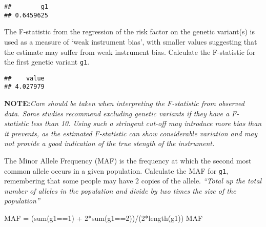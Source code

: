 \documentclass[
]{article}
\newenvironment{Shaded}{\begin{snugshade}}{\end{snugshade}}
\newcommand{\DecValTok}[1]{\textcolor[rgb]{0.00,0.00,0.81}{#1}}
\newcommand{\FunctionTok}[1]{\textcolor[rgb]{0.00,0.00,0.00}{#1}}
\newcommand{\NormalTok}[1]{#1}
\newcommand{\OtherTok}[1]{\textcolor[rgb]{0.56,0.35,0.01}{#1}}
\newcommand{\SpecialCharTok}[1]{\textcolor[rgb]{0.00,0.00,0.00}{#1}}
\begin{document}
\begin{verbatim}
##        g1 
## 0.6459625
\end{verbatim}

The F-statistic from the regression of the risk factor on the genetic
variant(s) is used as a measure of `weak instrument bias', with smaller
values suggesting that the estimate may suffer from weak instrument
bias. Calculate the F-statistic for the first genetic variant
\texttt{g1}.

\begin{Shaded}
\end{Shaded}

\begin{verbatim}
##    value 
## 4.027979
\end{verbatim}

\textbf{NOTE:}\emph{Care should be taken when interpreting the
F-statistic from observed data. Some studies recommend excluding genetic
variants if they have a F-statistic less than 10. Using such a stringent
cut-off may introduce more bias than it prevents, as the estimated
F-statistic can show considerable variation and may not provide a good
indication of the true stength of the instrument.}

The Minor Allele Frequency (MAF) is the frequency at which the second
most common allele occurs in a given population. Calculate the MAF for
\texttt{g1}, remembering that some people may have 2 copies of the
allele. \emph{``Total up the total number of alleles in the population
and divide by two times the size of the population''}

\begin{Shaded}
\begin{Highlighting}[]
\NormalTok{MAF }\OtherTok{=}\NormalTok{ (}\FunctionTok{sum}\NormalTok{(g1}\SpecialCharTok{==}\DecValTok{1}\NormalTok{) }\SpecialCharTok{+} \DecValTok{2}\SpecialCharTok{*}\FunctionTok{sum}\NormalTok{(g1}\SpecialCharTok{==}\DecValTok{2}\NormalTok{))}\SpecialCharTok{/}\NormalTok{(}\DecValTok{2}\SpecialCharTok{*}\FunctionTok{length}\NormalTok{(g1))}
\NormalTok{MAF}
\end{Highlighting}
\end{Shaded}
\end{document}
